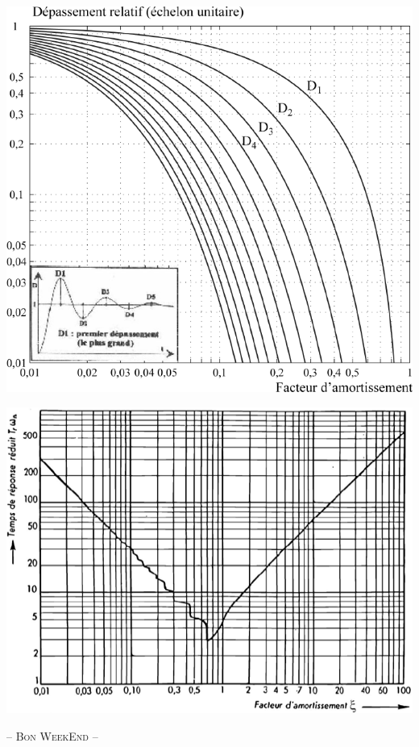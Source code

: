 \documentclass[10pt,oneside]{article}
\begin{document}
\begin{center}
\includegraphics[width=.8\textwidth]{png/image17.png}
\end{center}

\begin{center}
\includegraphics[width=.8\textwidth]{png/image18.png}
\end{center}

\begin{center}
\Large\textsc{-- Bon WeekEnd --}
\end{center}


\newpage{}
\end{document}
